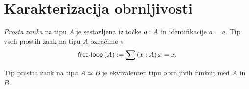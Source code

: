 \section{Karakterizacija obrnljivosti}

\begin{definicija}
  \emph{Prosta zanka} na tipu \(A\) je sestavljena iz točke \(a : A\) in
  identifikacije \(a = a\). Tip vseh prostih zank na tipu \(A\) označimo s
  \[\textnormal{\textsf{free-loop}}\,(A) := \sum \left( x : A \right) x = x.\]
\end{definicija}

\begin{izrek}
  Tip prostih zank na tipu \(A \simeq B\) je ekvivalenten tipu obrnljivih funkcij
  med \(A\) in \(B\).
\end{izrek}

